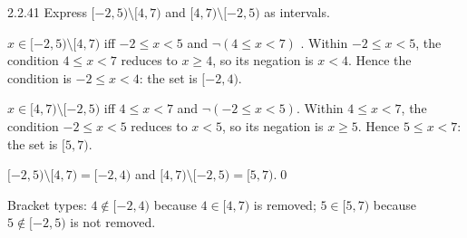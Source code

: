 \begin{bookex}[recommended]{2.2.41}
Express $[-2,5)\setminus[4,7)$ and $[4,7)\setminus[-2,5)$ as intervals.
\solution
\begin{steps}
\item $x\in[-2,5)\setminus[4,7)$ iff $-2\le x<5$ and $\neg(4\le x<7)$ . Within $-2\le x<5$, the condition $4\le x<7$ reduces to $x\ge4$, so its negation is $x<4$. Hence the condition is $-2\le x<4$: the set is $[-2,4)$.
\item $x\in[4,7)\setminus[-2,5)$ iff $4\le x<7$ and $\neg(-2\le x<5)$. Within $4\le x<7$, the condition $-2\le x<5$ reduces to $x<5$, so its negation is $x\ge5$. Hence $5\le x<7$: the set is $[5,7)$.
\end{steps}
\answer $[-2,5)\setminus[4,7)=[-2,4)$ and $[4,7)\setminus[-2,5)=[5,7)$.\qed
\begin{compare}
\item Bracket types: $4\notin[-2,4)$ because $4\in[4,7)$ is removed; $5\in[5,7)$ because $5\notin[-2,5)$ is not removed.
\end{compare}
\end{bookex}

